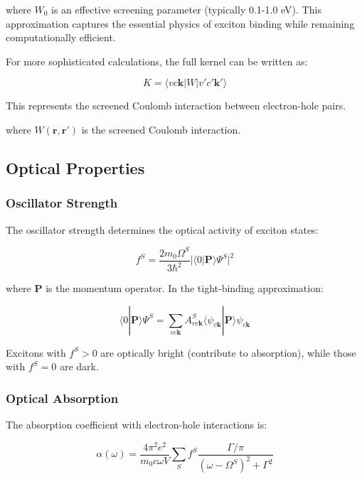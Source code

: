 \documentclass[11pt,a4paper]{article}
\newcommand{\braket}[2]{\langle #1|#2\rangle}
\begin{document}
where $W_0$ is an effective screening parameter (typically 0.1-1.0 eV). This approximation captures the essential physics of exciton binding while remaining computationally efficient.

For more sophisticated calculations, the full kernel can be written as:

\begin{equation}
K = \langle vc\mathbf{k} | W | v'c'\mathbf{k}' \rangle
\end{equation}

This represents the screened Coulomb interaction between electron-hole pairs.

where $W(\mathbf{r},\mathbf{r}')$ is the screened Coulomb interaction.

\subsection{Optical Properties}

\subsubsection{Oscillator Strength}

The oscillator strength determines the optical activity of exciton states:

\begin{equation}
f^S = \frac{2m_0 \Omega^S}{3\hbar^2} |\braket{0}{\mathbf{P}}{\Psi^S}|^2
\end{equation}

where $\mathbf{P}$ is the momentum operator. In the tight-binding approximation:

\begin{equation}
\braket{0}{\mathbf{P}}{\Psi^S} = \sum_{vc\mathbf{k}} A^S_{vc\mathbf{k}} \braket{\psi_{v\mathbf{k}}}{\mathbf{P}}{\psi_{c\mathbf{k}}}
\end{equation}

Excitons with $f^S > 0$ are optically bright (contribute to absorption), while those with $f^S = 0$ are dark.

\subsubsection{Optical Absorption}

The absorption coefficient with electron-hole interactions is:

\begin{equation}
\alpha(\omega) = \frac{4\pi^2 e^2}{m_0 c \omega V} \sum_S f^S \frac{\Gamma/\pi}{(\omega - \Omega^S)^2 + \Gamma^2}
\end{equation}
\end{document}
